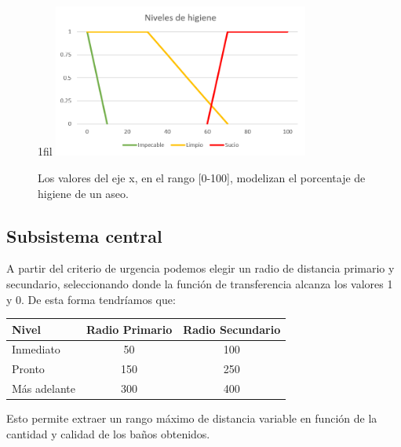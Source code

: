 \documentclass[13pt,a4paper]{article}
\makeatletter
\newcommand*{\centerfloat}{%
  \parindent \z@
  \leftskip \z@ \@plus 1fil \@minus \textwidth
  \rightskip\leftskip
  \parfillskip \z@skip}
\makeatother
\begin{document}
\begin{figure}[H]
  \centerfloat
  \includegraphics[width=0.75\textwidth]{img/3.png}
  \caption{Los valores del eje x, en el rango [0-100], modelizan el porcentaje de higiene de un aseo.}
  \label{higiene}
\end{figure}

\subsection{Subsistema central}

A partir del criterio de urgencia podemos elegir un radio de distancia primario y secundario, seleccionando donde la función de transferencia alcanza los valores 1 y 0. De esta forma tendríamos que:

\begin{table}[H]
  \centering
  \begin{tabular}{|l|c|c|}
  \hline
  \textbf{Nivel} & \multicolumn{1}{l|}{\textbf{Radio Primario}} & \multicolumn{1}{l|}{\textbf{Radio Secundario}} \\ \hline
  Inmediato      & 50          & 100           \\ \hline
  Pronto         & 150         & 250           \\ \hline
  Más adelante   & 300         & 400           \\ \hline
  \end{tabular}
\end{table}



Esto permite extraer un rango máximo de distancia variable en función de la cantidad y calidad de los baños obtenidos.
\end{document}

